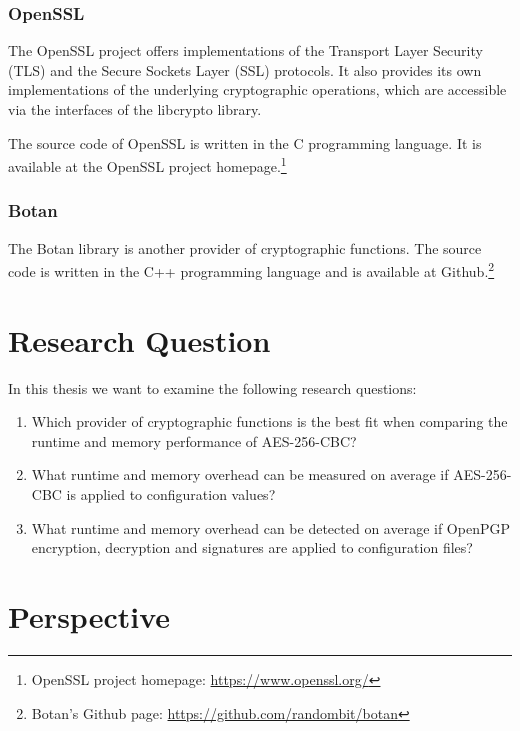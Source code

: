   \subsubsection{OpenSSL}

The OpenSSL project offers implementations of the Transport Layer Security (TLS) and the Secure Sockets Layer (SSL) protocols.
It also provides its own implementations of the underlying cryptographic operations, which are accessible via the interfaces of the libcrypto library.

The source code of OpenSSL is written in the C programming language.
It is available at the OpenSSL project homepage.\footnote{OpenSSL project homepage: \url{https://www.openssl.org/}}

  \subsubsection{Botan}

The Botan library is another provider of cryptographic functions.
The source code is written in the C++ programming language and is available at Github.\footnote{Botan's Github page: \url{https://github.com/randombit/botan}}

\section{Research Question}
\label{researchq}

In this thesis we want to examine the following research questions:

\begin{enumerate}
  \item Which provider of cryptographic functions is the best fit when comparing the runtime and memory performance of AES-256-CBC?
  \item What runtime and memory overhead can be measured on average if AES-256-CBC is applied to configuration values?
  \item What runtime and memory overhead can be detected on average if OpenPGP encryption, decryption and signatures are applied to configuration files?
\end{enumerate}

\section{Perspective}

